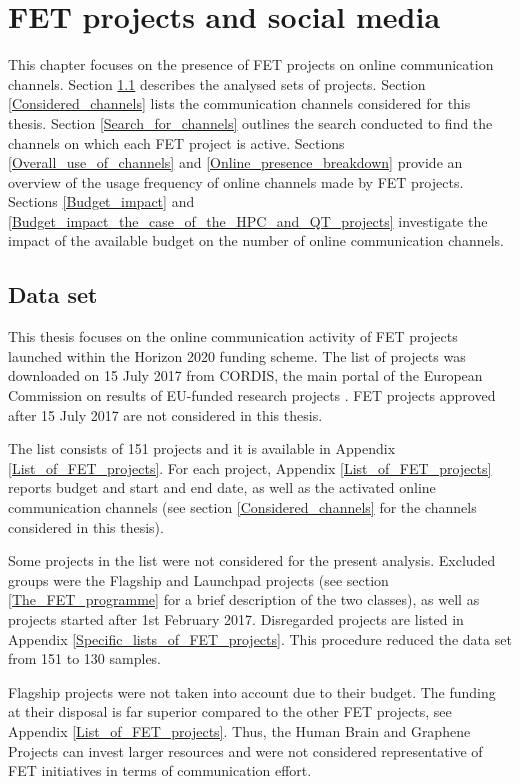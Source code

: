 \chapter{FET projects and social media} \label{FET_projects_and_social_media}
This chapter focuses on the presence of FET projects on online communication channels. Section \ref{Data_set} describes the analysed sets of projects. Section \ref{Considered_channels} lists the communication channels considered for this thesis. Section \ref{Search_for_channels} outlines the search conducted to find the channels on which each FET project is active. Sections \ref{Overall_use_of_channels} and \ref{Online_presence_breakdown} provide an overview of the usage frequency of online channels made by FET projects. Sections \ref{Budget_impact} and \ref{Budget_impact_the_case_of_the_HPC_and_QT_projects} investigate the impact of the available budget on the number of online communication channels.

\section{Data set} \label{Data_set}
This thesis focuses on the online communication activity of FET projects launched within the Horizon 2020 funding scheme. The list of projects was downloaded on 15 July 2017 from CORDIS, the main portal of the European Commission on results of EU-funded research projects \cite{CORDIS}. FET projects approved after 15 July 2017 are not considered in this thesis.

The list consists of 151 projects and it is available in Appendix \ref{List_of_FET_projects}. For each project, Appendix \ref{List_of_FET_projects} reports budget and start and end date, as well as the activated online communication channels (see section \ref{Considered_channels} for the channels considered in this thesis).   

Some projects in the list were not considered for the present analysis. Excluded groups were the Flagship and Launchpad projects (see section \ref{The_FET_programme} for a brief description of the two classes), as well as projects started after 1st February 2017. Disregarded projects are listed in Appendix \ref{Specific_lists_of_FET_projects}. This procedure reduced the data set from 151 to 130 samples.

Flagship projects were not taken into account due to their budget. The funding at their disposal is far superior compared to the other FET projects, see Appendix \ref{List_of_FET_projects}. Thus, the Human Brain and Graphene Projects can invest larger resources and were not considered representative of FET initiatives in terms of communication effort. 

